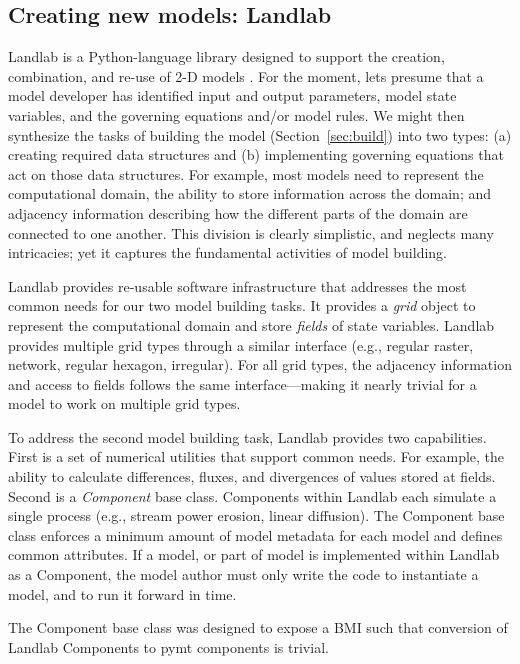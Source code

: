 \documentclass[12pt]{amsart}
\begin{document}
\subsection{Creating new models: Landlab}

Landlab is a Python-language library designed to support the creation, combination, and re-use of 2-D models \citep{hobley2017creative, barnhart2020short}. For the moment, lets presume that a model developer has identified input and output parameters, model state variables, and the governing equations and/or model rules. We might then synthesize the tasks of building the model (Section~\ref{sec:build}) into two types: (a) creating required data structures and (b) implementing governing equations that act on those data structures. For example, most models need to represent the computational domain, the ability to store information across the domain; and adjacency information describing how the different parts of the domain are connected to one another. This division is clearly simplistic, and neglects many intricacies; yet it captures the fundamental activities of model building. 

Landlab provides re-usable software infrastructure that addresses the most common needs for our two model building tasks. It provides a \textit{grid} object to represent the computational domain and store \textit{fields} of state variables. Landlab provides multiple grid types through a similar interface (e.g., regular raster, network, regular hexagon, irregular). For all grid types, the adjacency information and access to fields follows the same interface---making it nearly trivial for a model to work on multiple grid types. 

To address the second model building task, Landlab provides two capabilities. First is a set of numerical utilities that support common needs. For example, the ability to calculate differences, fluxes, and divergences of values stored at fields. Second is a \textit{Component} base class. Components within Landlab each simulate a single process (e.g., stream power erosion, linear diffusion). The Component base class enforces a minimum amount of model metadata for each model and defines common attributes. If a model, or part of model is implemented within Landlab as a Component, the model author must only write the code to instantiate a model, and to run it forward in time. 

The Component base class was designed to expose a BMI such that conversion of Landlab Components to pymt components is trivial. 
\end{document}

